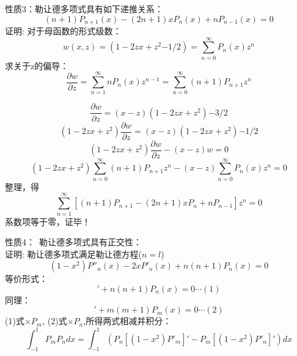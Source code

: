	{\alert{性质3：}}勒让德多项式具有如下递推关系：
	\begin{equation*}
		(n+1) P_{n+1}(x)-(2 n+1) x P_{n}(x)+n P_{n-1}(x)=0
	\end{equation*}	
	{\alert{证明:}} 对于母函数的形式级数：
	\begin{equation*}
		w(x, z)=(1-2zx+z^2{-1/2})=\sum_{n=0}^{\infty} P_{n}(x) z^{n}
	\end{equation*}	
	求关于z的偏导：
	\begin{equation*}
		\frac{\partial w}{\partial z}=\sum_{n=1}^{\infty} n P_{n}(x) z^{n-1}=\sum_{n=0}^{\infty}(n+1) P_{n+1} z^{n}
	\end{equation*}		
	


	\begin{equation*}
		\frac{\partial w}{\partial z}=	(x-z)(1-2zx+z^2){-3/2}
	\end{equation*}		
	\begin{equation*}
		(1-2zx+z^2)\frac{\partial w}{\partial z}=(x-z)(1-2zx+z^2){-1/2}
	\end{equation*}		
	\begin{equation*}
		(1-2zx+z^2)\frac{\partial w}{\partial z}-(x-z)w=0
	\end{equation*}		
	\begin{equation*}
		(1-2zx+z^2)\sum_{n=0}^{\infty}(n+1) P_{n+1} z^{n}-(x-z)\sum_{n=0}^{\infty} P_{n}(x) z^{n}=0
	\end{equation*}		
	整理，得
	\begin{equation*}
		\sum_{n=1}^{\infty} [(n+1)P_{n+1} -(2n+1)x P_n + nP_{n-1} ] z^{n}=0
	\end{equation*}		
	系数项等于零，{\alert{证毕！}}   	  
	


	{\alert{性质4：}}~勒让德多项式具有正交性：\\
	{\alert{证明:}}  勒让德多项式满足勒让德方程($n=l$)
	\begin{equation*}
		\left(1-x^{2}\right) P'' _n  (x) -2 x P' _n (x)+n(n+1)P_n(x)=0
	\end{equation*}		
	等价形式：
	\begin{equation*}
		[\left(1-x^{2}\right) P' _n  (x)]' +n(n+1)P_n(x)=0    \cdots  (1)
	\end{equation*}		
	同理：
	\begin{equation*}
		[\left(1-x^{2}\right) P' _m  (x)]' + m (m+1)P_m(x)=0    \cdots  (2)
	\end{equation*}		
	(1)式$\times P_m$, (2)式$\times P_n$,所得两式相减并积分： 
	{\small \begin{equation*}
			[n(n+1) -m (m+1)]\int_{-1}^{1} P_mP_n dx =\int_{-1}^{1} (P_n [\left(1-x^{2}\right) P' _m] '-P_m [\left(1-x^{2}\right) P' _n ]')dx
	\end{equation*}		}
	


